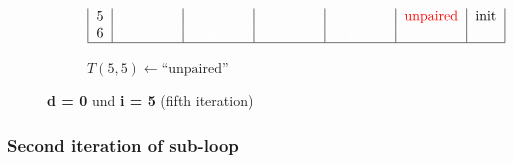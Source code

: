 \begin{figure}[H]
\begin{subfigure}[t]{0.65\textwidth}
\[\begin{tabular}{|c|c|c|c|c|c|c|}
                                    5     &          &          &          &          & \textcolor{red}{unpaired} & init  \\
                                    6 & \textcolor{white}{unpaired} & \textcolor{white}{unpaired} & \textcolor{white}{unpaired}
                                    & \textcolor{white}{unpaired}
                                    & \textcolor{white}{unpaired}
                                    & \textcolor{white}{init}
                                    \\ \hline
                        \end{tabular}
        \]
        \caption{$T(5,5) \gets \text{``unpaired''}$ }
    \end{subfigure}
    \caption{\textbf{d = 0} und \textbf{i = 5} (fifth iteration)}\label{fig:figure20}

\end{figure}

\subsubsection*{Second iteration of sub-loop}


